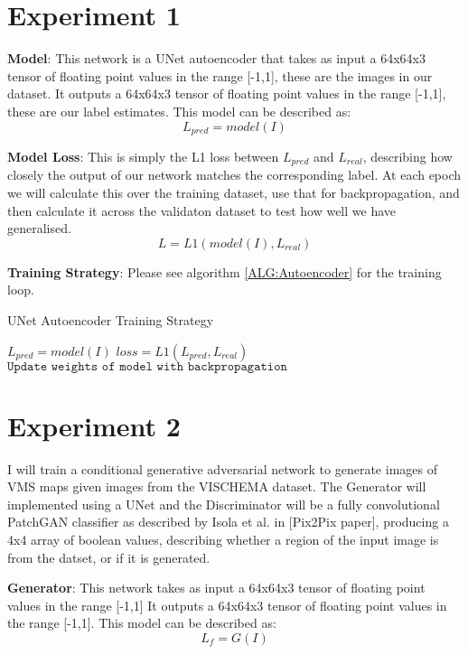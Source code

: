 \documentclass{UoYCSproject}
\begin{document}
\section{Experiment 1}

\textbf{Model}: This network is a UNet autoencoder that takes as input a 64x64x3 tensor of floating point values in the range [-1,1], these are the images in our dataset.
It outputs a 64x64x3 tensor of floating point values in the range [-1,1], these are our label estimates.
This model can be described as: \[ L_{pred} = model(I) \]

\textbf{Model Loss}: This is simply the L1 loss between $L_{pred}$ and $L_{real}$, describing how closely the output of our network matches the corresponding label. At each epoch we will calculate this over the training dataset, use that for backpropagation, and then calculate it across the validaton dataset to test how well we have generalised.
\[ L = L1( model(I), L_{real} ) \]

\textbf{Training Strategy}: Please see algorithm \ref{ALG:Autoencoder} for the training loop.

\begin{algorithm}
\caption{UNet Autoencoder Training Strategy}\label{ALG:Autoencoder}
\begin{algorithmic}[1]
\State
\State $L_{pred} = model(I)$
\State $loss = L1( L_{pred}, L_{real} ) $
\State $\texttt{Update weights of model with backpropagation}$
\State
\EndFor
\EndFor
\end{algorithmic}
\end{algorithm}

\section{Experiment 2}

I will train a conditional generative adversarial network to generate images of VMS maps given images from the VISCHEMA dataset. The Generator will implemented using a UNet and the Discriminator will be a fully convolutional PatchGAN classifier as described by Isola et al. in [Pix2Pix paper], producing a 4x4 array of boolean values, describing whether a region of the input image is from the datset, or if it is generated.

\textbf{Generator}: This network takes as input a 64x64x3 tensor of floating point values in the range [-1,1]
It outputs a 64x64x3 tensor of floating point values in the range [-1,1].
This model can be described as: \[ L_{f} = G(I) \]
\end{document}
